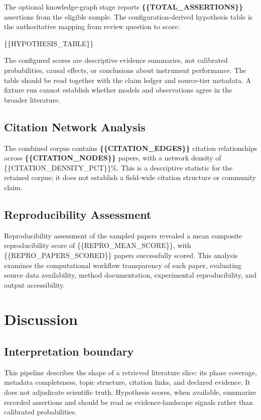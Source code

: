 \documentclass[
]{article}
\begin{document}
The optional knowledge-graph stage reports
\textbf{\{\{TOTAL\_ASSERTIONS\}\}} assertions from the eligible sample.
The configuration-derived hypothesis table is the authoritative mapping
from review question to score:

\{\{HYPOTHESIS\_TABLE\}\}

The configured scores are descriptive evidence summaries, not calibrated
probabilities, causal effects, or conclusions about instrument
performance. The table should be read together with the claim ledger and
source-tier metadata. A fixture run cannot establish whether models and
observations agree in the broader literature.

\subsection{Citation Network Analysis}\label{citation-network-analysis}

The combined corpus contains \textbf{\{\{CITATION\_EDGES\}\}} citation
relationships across \textbf{\{\{CITATION\_NODES\}\}} papers, with a
network density of \{\{CITATION\_DENSITY\_PCT\}\}\%. This is a
descriptive statistic for the retained corpus; it does not establish a
field-wide citation structure or community claim.

\subsection{Reproducibility
Assessment}\label{reproducibility-assessment}

Reproducibility assessment of the sampled papers revealed a mean
composite reproducibility score of \{\{REPRO\_MEAN\_SCORE\}\}, with
\{\{REPRO\_PAPERS\_SCORED\}\} papers successfully scored. This analysis
examines the computational workflow transparency of each paper,
evaluating source data availability, method documentation, experimental
reproducibility, and output accessibility.

\newpage

\section{Discussion}\label{discussion}

\subsection{Interpretation boundary}\label{interpretation-boundary}

This pipeline describes the shape of a retrieved literature slice: its
phase coverage, metadata completeness, topic structure, citation links,
and declared evidence. It does not adjudicate scientific truth.
Hypothesis scores, when available, summarize recorded assertions and
should be read as evidence-landscape signals rather than calibrated
probabilities.
\end{document}
